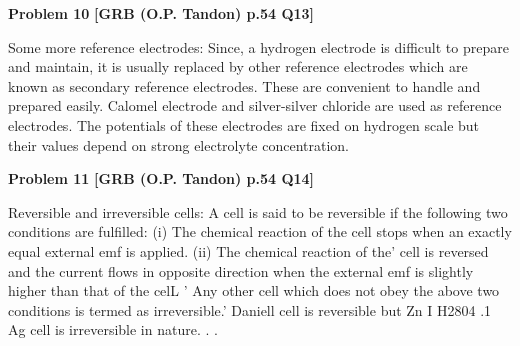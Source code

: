 \begin{problembox}
\textbf{Problem 10} \hfill \textbf{[GRB (O.P. Tandon) p.54 Q13]}
\label{q:ext-grb_all_questions-10}

Some more reference electrodes: Since, a hydrogen 
electrode is difficult to prepare and maintain, it is usually 
replaced by other reference electrodes which are known as 
secondary reference electrodes. These are convenient to handle 
and prepared easily. Calomel electrode and silver-silver chloride 
are used as reference electrodes. The potentials of these 
electrodes are fixed on hydrogen scale but their values depend on 
strong electrolyte concentration.
\end{problembox}

\begin{problembox}
\textbf{Problem 11} \hfill \textbf{[GRB (O.P. Tandon) p.54 Q14]}
\label{q:ext-grb_all_questions-11}

Reversible and irreversible cells: A cell is said to be 
reversible if the following two conditions are fulfilled: 
(i) The chemical reaction of the cell stops when an exactly 
equal external emf is applied. 
(ii) The chemical reaction of the' cell is reversed and the 
current flows in opposite direction when the external emf is 
slightly higher than that of the celL 
' 
Any other cell which does not obey the above two conditions 
is termed as irreversible.' Daniell cell is reversible but 
Zn I H2804 .1 Ag cell is irreversible in nature. 
. 
.
\end{problembox}

